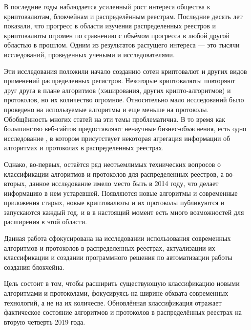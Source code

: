 \tab[0.88cm]В последние годы наблюдается усиленный рост интереса общества к криптовалютам,
блокчейнам и распределённым реестрам.
Последние десять лет показали, что прогресс в области изучения распределенных
реестров и криптовалюты огромен по сравнению с объёмом прогресса в любой
другой областью в прошлом.
Одним из результатов растущего интереса --- это тысячи исследований,
проведенных учеными и исследователями.

Эти исследования положили начало созданию сотен криптовалют и других видов
применений распределенных регистров.  Некоторые криптовалюты повторяют друг
друга в плане алгоритмов (хэширования, других крипто-алгоритмов) и протоколов,
но их количество огромное. Относительно мало исследований было проведено на
используемые алгоритмы и еще меньше на протоколы. Обобщённость многих статей на
эти темы проблематична. В то время как большинство веб-сайтов предоставляют
ненаучные бизнес-объяснения, есть одно исследование \cite{TimSwanson2014}, в
котором присутствует некоторая агрегация информации об алгоритмах и протоколах
в распределенных реестрах.

Однако, во-первых, остаётся ряд неотъемлимых технических вопросов о
классификации алгоритмов и протоколов для распределенных реестров, а во-вторых,
данное исследование имело место быть в 2014 году, что делает информацию в нем
устаревшей.  Появляются новые алгоритмы и современные приложения старых, новые
криптовалюты и их протоколы публикуются и запускаются каждый год, и в в
настоящий момент есть много возможностей для расширения в этой области.

Данная работа сфокусирована на исследовании использования современных
алгоритмов и протоколов в распределенных реестрах, актуализации их
классификации и создании программного решения по автоматизации работы создания
блокчейна.

Цель состоит в том, чтобы расширить существующую классификацию
новыми алгоритмами и протоколами, фокусируясь на ширине обхвата современных
технологий, а не на их количесве. Обновлённая классификация отражает
фактическое состояние алгоритмов и протоколов в распределённых реестрах на
вторую четверть 2019 года.

